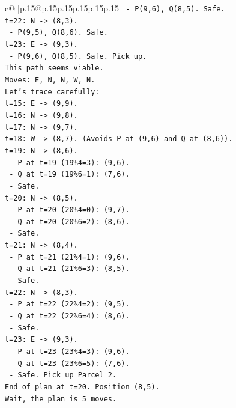 \documentclass{article}
\begin{document}
{\begin{supertabular}{c@{$\;$}|p{.15\linewidth}@{}p{.15\linewidth}p{.15\linewidth}p{.15\linewidth}p{.15\linewidth}p{.15\linewidth}}
{{{\texttt{  {-} P(9,6), Q(8,5). Safe.} \\
\texttt{t=22: N {-}> (8,3).} \\
\texttt{  {-} P(9,5), Q(8,6). Safe.} \\
\texttt{t=23: E {-}> (9,3).} \\
\texttt{  {-} P(9,6), Q(8,5). Safe. Pick up.} \\
\texttt{This path seems viable.} \\
\texttt{Moves: E, N, N, W, N.} \\
\texttt{Let's trace carefully:} \\
\texttt{t=15: E {-}> (9,9).} \\
\texttt{t=16: N {-}> (9,8).} \\
\texttt{t=17: N {-}> (9,7).} \\
\texttt{t=18: W {-}> (8,7). (Avoids P at (9,6) and Q at (8,6)).} \\
\texttt{t=19: N {-}> (8,6).} \\
\texttt{  {-} P at t=19 (19\%4=3): (9,6).} \\
\texttt{  {-} Q at t=19 (19\%6=1): (7,6).} \\
\texttt{  {-} Safe.} \\
\texttt{t=20: N {-}> (8,5).} \\
\texttt{  {-} P at t=20 (20\%4=0): (9,7).} \\
\texttt{  {-} Q at t=20 (20\%6=2): (8,6).} \\
\texttt{  {-} Safe.} \\
\texttt{t=21: N {-}> (8,4).} \\
\texttt{  {-} P at t=21 (21\%4=1): (9,6).} \\
\texttt{  {-} Q at t=21 (21\%6=3): (8,5).} \\
\texttt{  {-} Safe.} \\
\texttt{t=22: N {-}> (8,3).} \\
\texttt{  {-} P at t=22 (22\%4=2): (9,5).} \\
\texttt{  {-} Q at t=22 (22\%6=4): (8,6).} \\
\texttt{  {-} Safe.} \\
\texttt{t=23: E {-}> (9,3).} \\
\texttt{  {-} P at t=23 (23\%4=3): (9,6).} \\
\texttt{  {-} Q at t=23 (23\%6=5): (7,6).} \\
\texttt{  {-} Safe. Pick up Parcel 2.} \\
\texttt{End of plan at t=20. Position (8,5).} \\
\texttt{Wait, the plan is 5 moves.} \\
}}}
\end{supertabular}}
\end{document}
